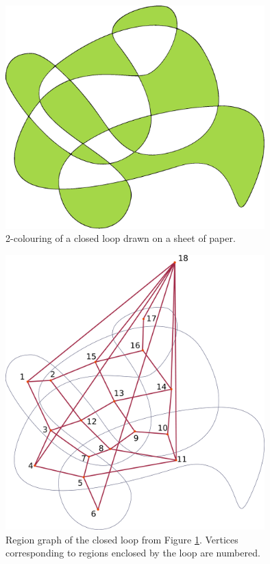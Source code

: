 \documentclass{article}
\theoremstyle{definition}
\theoremstyle{definition}
\theoremstyle{plain}
\begin{document}
\maketitle


\begin{figure}
\centering
\includegraphics[width=10cm]{curve1.eps}
\caption{2-colouring of a closed loop drawn on a sheet of paper.}
\label{figure:curve1}
\end{figure}

\begin{figure}
\centering
\includegraphics[width=10cm]{curve2.eps}
\caption{Region graph of the closed loop from Figure \ref{figure:curve1}. Vertices corresponding to regions enclosed by the loop are numbered.}
\label{figure:curve2}
\end{figure}
\end{document}
